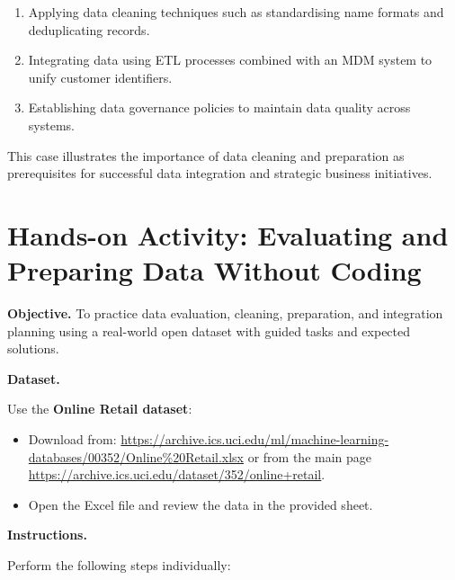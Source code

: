 \begin{enumerate}
	\item Applying data cleaning techniques such as standardising name formats and deduplicating records.
	\item Integrating data using ETL processes combined with an MDM system to unify customer identifiers.
	\item Establishing data governance policies to maintain data quality across systems.
\end{enumerate}

This case illustrates the importance of data cleaning and preparation as prerequisites for successful data integration and strategic business initiatives.


\section{Hands-on Activity: Evaluating and Preparing Data Without Coding}

\textbf{Objective.}  
To practice data evaluation, cleaning, preparation, and integration planning using a real-world open dataset with guided tasks and expected solutions.

\textbf{Dataset.}

Use the \textbf{Online Retail dataset}:

\begin{itemize}
	\item Download from: \url{https://archive.ics.uci.edu/ml/machine-learning-databases/00352/Online%20Retail.xlsx} or from the main page \url{https://archive.ics.uci.edu/dataset/352/online+retail}.
	\item Open the Excel file and review the data in the provided sheet.
\end{itemize}

\textbf{Instructions.}

Perform the following steps individually:

